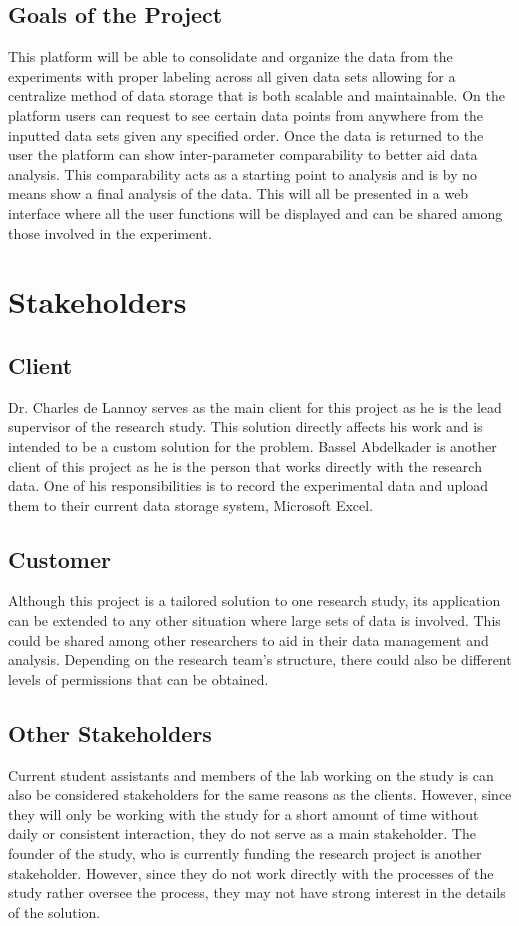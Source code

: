 \documentclass[12pt]{article}
\begin{document}
\subsection{Goals of the Project}
This platform will be able to consolidate and organize the data from the
experiments with proper labeling across all given data sets allowing for a
centralize method of data storage that is both scalable and maintainable. On the
platform users can request to see certain data points from anywhere from the
inputted data sets given any specified order. Once the data is returned to the
user the platform can show inter-parameter comparability to better aid data
analysis. This comparability acts as a starting point to analysis and is by no
means show a final analysis of the data. This will all be presented in a web
interface where all the user functions will be displayed and can be shared among
those involved in the experiment.   
\section{Stakeholders}

\subsection{Client}
Dr. Charles de Lannoy serves as the main client for this project as he is the
lead supervisor of the research study. This solution directly affects his work and
is intended to be a custom solution for the problem. Bassel Abdelkader is
another client of this project as he is the person that works directly with the
research data. One of his responsibilities is to record the experimental data and
upload them to their current data storage system, Microsoft Excel. 
\subsection{Customer}
Although this project is a tailored solution to one research study, its
application can be extended to any other situation where large sets of data is
involved. This could be shared among other researchers to aid in their data
management and analysis. Depending on the research team's structure, there could
also be different levels of permissions that can be obtained.
\subsection{Other Stakeholders}
Current student assistants and members of the lab working on the study is can also be
considered stakeholders for the same reasons as the clients. However, since they
will only be working with the study for a short amount of time without daily or
consistent interaction, they do not serve as a main stakeholder. The founder of
the study, who is currently funding the research project is another stakeholder.
However, since they do not work directly with the processes of the study rather
oversee the process, they may not have strong interest in the details of the solution. 
\end{document}
